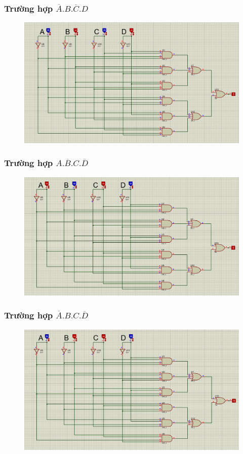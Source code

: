 \subsubsection{Trường hợp $\overline{A}.B.\overline{C}.D$}
\begin{figure}[H]
    \centering
    \includegraphics[width=\textwidth]{pictures/b2.4.png}
\end{figure}
\subsubsection{Trường hợp $A.\overline{B}.C.\overline{D}$}
\begin{figure}[H]
    \centering
    \includegraphics[width=\textwidth]{pictures/b2.3.png}
\end{figure}
\subsubsection{Trường hợp $\overline{A}.B.C.\overline{D}$}
\begin{figure}[H]
    \centering
    \includegraphics[width=\textwidth]{pictures/b2.6.png}
\end{figure}
